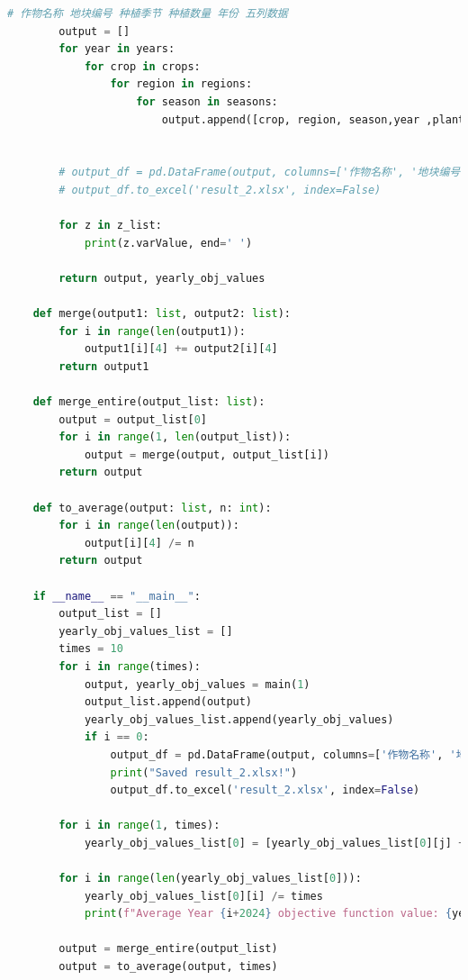 \documentclass{cumcmthesis}
\begin{document}
\begin{appendices}
\begin{lstlisting}[language=python]
        # 作物名称 地块编号 种植季节 种植数量 年份 五列数据
        output = []
        for year in years:
            for crop in crops:
                for region in regions:
                    for season in seasons:
                        output.append([crop, region, season,year ,planting_area[(crop, region, year, season)].varValue])
    
    
        # output_df = pd.DataFrame(output, columns=['作物名称', '地块编号', '种植季节','年份', '种植数量'])
        # output_df.to_excel('result_2.xlsx', index=False)
    
        for z in z_list:
            print(z.varValue, end=' ')
    
        return output, yearly_obj_values
    
    def merge(output1: list, output2: list):
        for i in range(len(output1)):
            output1[i][4] += output2[i][4]
        return output1
    
    def merge_entire(output_list: list):
        output = output_list[0]
        for i in range(1, len(output_list)):
            output = merge(output, output_list[i])
        return output
    
    def to_average(output: list, n: int):
        for i in range(len(output)):
            output[i][4] /= n
        return output
    
    if __name__ == "__main__":
        output_list = []
        yearly_obj_values_list = []
        times = 10
        for i in range(times):
            output, yearly_obj_values = main(1)
            output_list.append(output)
            yearly_obj_values_list.append(yearly_obj_values)
            if i == 0:
                output_df = pd.DataFrame(output, columns=['作物名称', '地块编号', '种植季节','年份', '种植数量'])
                print("Saved result_2.xlsx!")
                output_df.to_excel('result_2.xlsx', index=False)
    
        for i in range(1, times):
            yearly_obj_values_list[0] = [yearly_obj_values_list[0][j] + yearly_obj_values_list[i][j] for j in range(len(yearly_obj_values_list[0]))]
        
        for i in range(len(yearly_obj_values_list[0])):
            yearly_obj_values_list[0][i] /= times
            print(f"Average Year {i+2024} objective function value: {yearly_obj_values_list[0][i]}")
    
        output = merge_entire(output_list)
        output = to_average(output, times)
    

\end{lstlisting}
\end{appendices}
\end{document}
